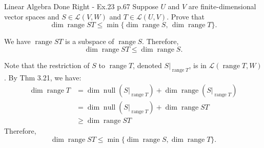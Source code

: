 \begin{problem}{}{}{Linear Algebra Done Right - Ex.23 p.67}
Suppose \(U\) and \(V\) are finite-dimensional vector spaces and
\(S \in \mathcal{L}(V,W)\) and \(T \in \mathcal{L}(U,V)\).
Prove that
\[
    \dim \operatorname{range} ST
    \leq
    \min\{\dim \operatorname{range} S,\,
    \dim \operatorname{range} T\}.
\]
\end{problem}

\begin{solution}
    We have $\operatorname{range} ST$ is a subspace of $\operatorname{range} S$.
    Therefore,
    \[ \dim \operatorname{range} ST \leq \dim \operatorname{range} S. \]

    Note that the restriction of $S$ to $\operatorname{range} T$,
    denoted $S|_{\operatorname{range} T}$, is in $\mathcal{L}(\operatorname{range} T, W)$.
    By Thm 3.21, we have:
    \begin{align*}
        \dim \operatorname{range} T & = \dim \operatorname{null} (S|_{\operatorname{range} T})
        + \dim \operatorname{range} (S|_{\operatorname{range} T})                                                             \\
                                    & = \dim \operatorname{null} (S|_{\operatorname{range} T}) + \dim \operatorname{range} ST \\
                                    & \geq \dim \operatorname{range} ST
    \end{align*}
    Therefore,
    \[ \dim \operatorname{range} ST \leq \min \{ \dim \operatorname{range} S, \dim \operatorname{range} T \}. \]
\end{solution}